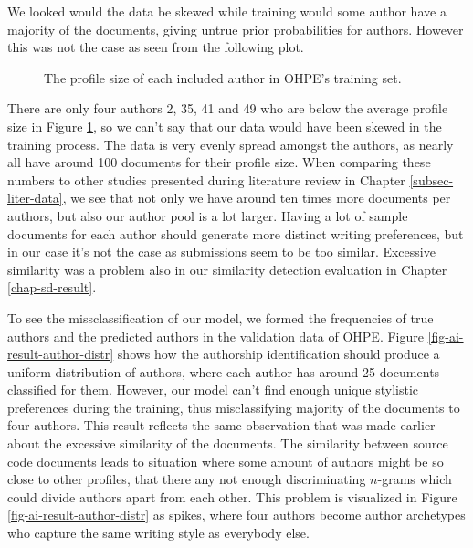 We looked would the data be skewed while training \ie would some author have a majority of the documents, giving untrue prior probabilities for authors. However this was not the case as seen from the following plot.

\begin{figure}[ht]
    \centering
    \setlength\figureheight{5.5cm}
    \setlength\figurewidth{\textwidth}
    
    \caption{The profile size of each included author in OHPE's training set.}
    \label{fig-author-to-document-dist-ohpe}
\end{figure}

\noindent
There are only four authors 2, 35, 41 and 49 who are below the average profile size in Figure \ref{fig-author-to-document-dist-ohpe}, so we can't say that our data would have been skewed in the training process. The data is very evenly spread amongst the authors, as nearly all have around 100 documents for their profile size. When comparing these numbers to other studies presented during literature review in Chapter \ref{subsec-liter-data}, we see that not only we have around ten times more documents per authors, but also our author pool is a lot larger. Having a lot of sample documents for each author should generate more distinct writing preferences, but in our case it's not the case as submissions seem to be too similar. Excessive similarity was a problem also in our similarity detection evaluation in Chapter \ref{chap-sd-result}.


To see the missclassification of our model, we formed the frequencies of true authors and the predicted authors in the validation data of OHPE. Figure \ref{fig-ai-result-author-distr} shows how the authorship identification should produce a uniform distribution of authors, where each author has around 25 documents classified for them. However, our model can't find enough unique stylistic preferences during the training, thus misclassifying majority of the documents to four authors. This result reflects the same observation that was made earlier about the excessive similarity of the documents. The similarity between source code documents leads to situation where some amount of authors might be so close to other profiles, that there any not enough discriminating $n$-grams which could divide authors apart from each other. This problem is visualized in Figure \ref{fig-ai-result-author-distr} as spikes, where four authors become author archetypes who capture the same writing style as everybody else.

